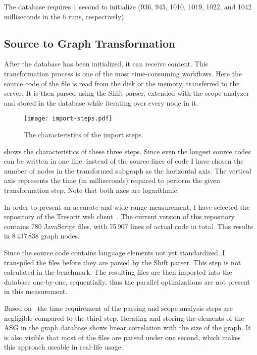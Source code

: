 The database requires 1 second to initialize (936, 945, 1010, 1019, 1022, and 1042 milliseconds in the 6 runs, respectively).

\subsection{Source to Graph Transformation}
After the database has been initialized, it can receive content. This transformation process is one of the most time-consuming workflows. Here the source code of the file is read from the disk or the memory, transferred to the server. It is then parsed using the Shift parser, extended with the scope analyzer and stored in the database while iterating over every node in it.

\begin{figure}[!htb]
  \centering
  \texttt{[image: import-steps.pdf]}
  \caption{The characteristics of the import steps.}
  \label{fig:import-steps}
\end{figure}

 shows the characteristics of these three steps. Since even the longest source codes can be written in one line, instead of the source lines of code I have chosen the number of nodes in the transformed subgraph as the horizontal axis. The vertical axis represents the time (in milliseconds) required to perform the given transformation step. Note that both axes are logarithmic.

In order to present an accurate and wide-range measurement, I have selected the repository of the Tresorit web client~\cite{tresorit-webclient}. The current version of this repository contains 780 JavaScript files, with 75\,907 lines of actual code in total. This results in 8\,437\,838 graph nodes.

Since the source code contains language elements not yet standardized, I transpiled the files before they are parsed by the Shift parser. This step is not calculated in the benchmark. The resulting files are then imported into the database one-by-one, sequentially, thus the parallel optimizations are not present in this measurement.

Based on~ the time requirement of the parsing and scope analysis steps are negligible compared to the third step. Iterating and storing the elements of the ASG in the graph database shows linear correlation with the size of the graph. It is also visible that most of the files are parsed under one second, which makes this approach useable in real-life usage.

